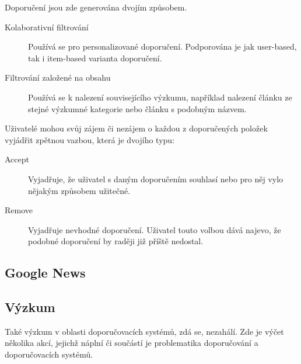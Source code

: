 \documentclass[thesis=M,czech]{FITthesis}[2014/05/07]
\begin{document}
Doporučení jsou zde generována dvojím způsobem. 

\begin{description}
	\item[Kolaborativní filtrování] Používá se pro personalizované doporučení. Podporována je jak user-based, tak i item-based varianta doporučení.
	\item[Filtrování založené na obsahu] Používá se k nalezení souvisejícího výzkumu, například nalezení článku ze stejné výzkumné kategorie nebo článku s podobným názvem. 
\end{description}

Uživatelé mohou svůj zájem či nezájem o každou z doporučených položek vyjádřit zpětnou vazbou, která je dvojího typu:

\begin{description}
	\item[Accept] Vyjadřuje, že uživatel s daným doporučením souhlasí nebo pro něj vylo nějakým způsobem užitečné.
	\item[Remove] Vyjadřuje nevhodné doporučení. Uživatel touto volbou dává najevo, že podobné doporučení by raději již příště nedostal.
\end{description}

\subsection{Google News}	


\subsection{Výzkum}

Také výzkum v oblasti doporučovacích systémů, zdá se, nezahálí. Zde je výčet několika akcí, jejichž náplní či součástí je problematika doporučování a doporučovacích systémů.
\end{document}
